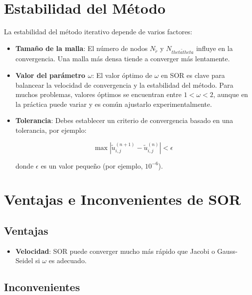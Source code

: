 \section{Estabilidad del Método}

La estabilidad del método iterativo depende de varios factores:

\begin{itemize}
    \item \textbf{Tamaño de la malla}: El número de nodos \( N_{\tilde{r}} \) y \( N_{\tilde{thetatheta}} \) influye en la convergencia. Una malla más densa tiende a converger más lentamente.
    \item \textbf{Valor del parámetro \( \omega \)}: El valor óptimo de \( \omega \) en SOR es clave para balancear la velocidad de convergencia y la estabilidad del método. Para muchos problemas, valores óptimos se encuentran entre \( 1 < \omega < 2 \), aunque en la práctica puede variar y es común ajustarlo experimentalmente.
    \item \textbf{Tolerancia}: Debes establecer un criterio de convergencia basado en una tolerancia, por ejemplo:

    \begin{equation}
        \max \left| \tilde{u}_{i,j}^{(n+1)} - \tilde{u}_{i,j}^{(n)} \right| < \epsilon
    \end{equation}

    donde \( \epsilon \) es un valor pequeño (por ejemplo, \( 10^{-6} \)).
\end{itemize}

\section{Ventajas e Inconvenientes de SOR}

\subsection{Ventajas}

\begin{itemize}
    \item \textbf{Velocidad}: SOR puede converger mucho más rápido que Jacobi o Gauss-Seidel si \( \omega \) es adecuado.
\end{itemize}

\subsection{Inconvenientes}

